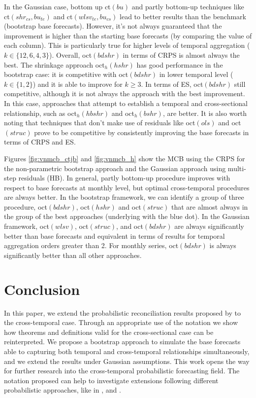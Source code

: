 \documentclass[a4paper,11pt]{article}
\theoremstyle{definition}
\begin{document}
In the Gaussian case, bottom up ct$(bu)$ and partly bottom-up techniques like ct$(shr_{cs}, bu_{te})$ and ct$(wlsv_{te}, bu_{cs})$ lead to better results than the benchmark (bootstrap base forecasts). However, it's not always guaranteed that the improvement is higher than the starting base forecasts (by comparing the value of each column). This is particularly true for higher levels of temporal aggregation ($k \in \{12, 6, 4, 3\}$). Overall, oct$(bdshr)$ in terms of CRPS is almost always the best. The shrinkage approach oct$_h(hshr)$ has good performance in the bootstrap case: it is competitive with oct$(bdshr)$ in lower temporal level ($k \in \{1,2\}$) and it is able to improve for $k\ge 3$. In terms of ES, oct$(bdshr)$ still competitive, although it is not always the approach with the best improvement. In this case, approaches that attempt to establish a temporal and cross-sectional relationship, such as oct$_h(hbshr)$ and oct$_h(bshr)$, are better. %
It is also worth noting that techniques that don't make use of residuals like oct$(ols)$ and oct$(struc)$ prove to be competitive by consistently improving the base forecasts in terms of CRPS and ES.

Figures \ref{fig:vnmcb_ctjb} and \ref{fig:vnmcb_h} show the MCB using the CRPS for the non-parametric bootstrap approach and the Gaussian approach using multi-step residuals (HB). In general, partly bottom-up procedure improves with respect to base forecasts at monthly level, but optimal cross-temporal procedures are always better. In the bootstrap framework, we can identify a group of three procedure, oct$(bdshr)$, oct$(hshr)$ and oct$(struc)$ that are almost always in the group of the best approaches (underlying with the blue dot). In the Gaussian framework, oct$(wlsv)$, oct$(struc)$, and oct$(bdshr)$ are always significantly better than base forecasts and equivalent in terms of results for temporal aggregation orders greater than 2. For monthly series, oct$(bdshr)$ is always significantly better than all other approaches.

\section{Conclusion}\label{sec:conclusion}

In this paper, we extend the probabilistic reconciliation results proposed by \cite{panagiotelis2023} to the cross-temporal case. Through an appropriate use of the notation we show how theorems and definitions valid for the cross-sectional case can be reinterpreted. We propose a bootstrap approach to simulate the base forecasts able to capturing both temporal and cross-temporal relationships simultaneously, and we extend the results under Gaussian assumptions. This work opens the way for further research into the cross-temporal probabilistic forecasting field. The notation proposed can help to investigate extensions following different probabilistic approaches, like in \cite{jeon2019}, \cite{bentaieb2021} and \cite{corani2022}.
\end{document}
